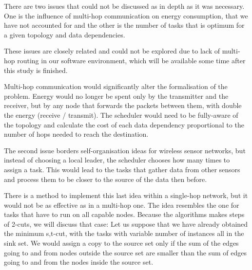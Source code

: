 There are two issues that could not be discussed as in depth as it was necessary. One is the influence of multi-hop 
communication on energy consumption, that we have not accounted for and the other is the number of tasks that is optimum
for a given topology and data dependencies.

These issues are closely related and could not be explored due to lack of multi-hop routing in our software environment,
which will be available some time after this study is finished.

Multi-hop communication would significantly alter the formalisation of the problem. Energy would no longer be spent only 
by the transmitter and the receiver, but by any node that forwards the packets between them, with double the energy 
(receive / transmit). The scheduler would need to be fully-aware of the topology and calculate the cost of each data 
dependency proportional to the number of hops needed to reach the destination.

The second issue borders self-organisation ideas for wireless sensor networks, but instead of choosing a local leader, the scheduler
chooses how many times to assign a task. This would lead to the tasks that gather data from other sensors and process them
to be closer to the source of the data then before.

There is a method to implement this last idea within a single-hop network, but it would not be as effective as in a multi-hop one.
The idea resembles the one for tasks that have to run on all capable nodes. Because the algorithms makes steps of 2-cuts, we 
will discuss that case: Let us suppose that we have already obtained the minimum s,t-cut, with the tasks with variable number 
of instances all in the sink set. We would assign a copy to the source set only if the sum of the edges going to and from 
nodes outside the source set are smaller than the sum of edges going to and from the nodes inside the source set.